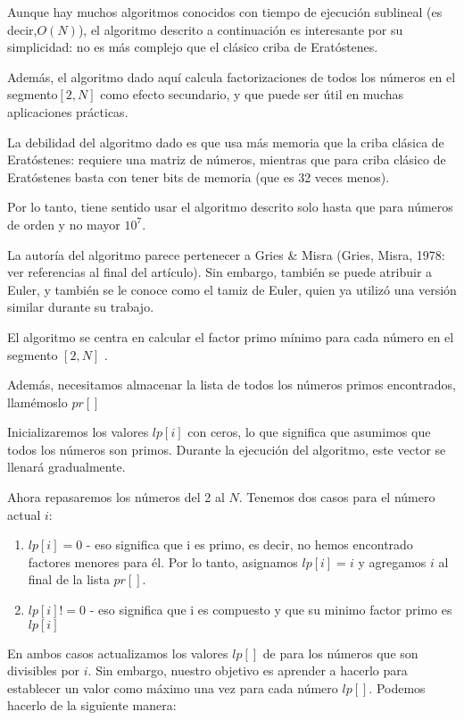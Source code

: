 Aunque hay muchos algoritmos conocidos con tiempo de ejecución sublineal (es decir,$O(N)$), el algoritmo descrito a continuación es interesante por su simplicidad: no es más complejo que el clásico criba de Eratóstenes.

Además, el algoritmo dado aquí calcula factorizaciones de todos los números en el segmento$[2,N]$ como efecto secundario, y que puede ser útil en muchas aplicaciones prácticas.

La debilidad del algoritmo dado es que usa más memoria que la criba clásica de Eratóstenes: requiere una matriz de números, mientras que para criba clásico de Eratóstenes basta con tener
bits de memoria (que es 32 veces menos).

Por lo tanto, tiene sentido usar el algoritmo descrito solo hasta que para números de orden
y no mayor $10^{7}$.

La autoría del algoritmo parece pertenecer a Gries \& Misra (Gries, Misra, 1978: ver referencias al final del artículo). Sin embargo, también se puede atribuir a Euler, y también se le conoce como el tamiz de Euler, quien ya utilizó una versión similar durante su trabajo.

El algoritmo se centra en calcular el factor primo mínimo para cada número en el segmento $[2,N]$ . 

Además, necesitamos almacenar la lista de todos los números primos encontrados, llamémoslo $pr[]$

Inicializaremos los valores $lp[i]$ con ceros, lo que significa que asumimos que todos los números son primos. Durante la ejecución del algoritmo, este vector se llenará gradualmente.

Ahora repasaremos los números del 2 al $N$. Tenemos dos casos para el número actual $i$:

\begin{enumerate}
	\item $lp[i] = 0$ - eso significa que i es primo, es decir, no hemos encontrado factores menores para él. Por lo tanto, asignamos $lp [i] = i$ y agregamos $i$ al final de la lista $pr[]$. 
	\item $lp[i] != 0$ - eso significa que i es compuesto y que su minimo factor primo es $lp[i]$
\end{enumerate}  

En ambos casos actualizamos los valores $lp[]$ de para los números que son divisibles por $i$. Sin embargo, nuestro objetivo es aprender a hacerlo para establecer un valor como máximo una vez para cada número $lp[]$. Podemos hacerlo de la siguiente manera:

